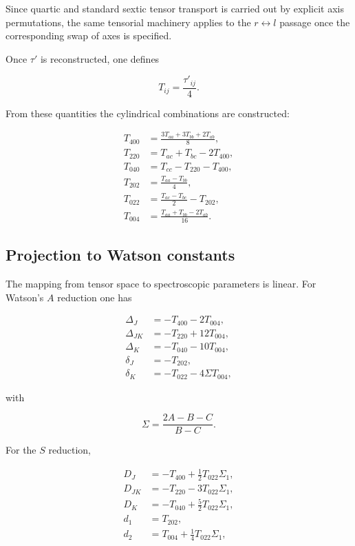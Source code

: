 \documentclass[aip,jcp,reprint,floatfix]{revtex4-2}
\begin{document}
Since quartic and standard sextic tensor transport is carried out by
explicit axis permutations, the same tensorial machinery applies to
the $r \leftrightarrow l$ passage once the corresponding swap of axes
is specified.

Once $\tau'$ is reconstructed, one defines

\begin{equation}
T_{ij} = \frac{\tau'_{ij}}{4}.
\end{equation}

From these quantities the cylindrical combinations are constructed:

\begin{align}
T_{400} &= \frac{3T_{aa}+3T_{bb}+2T_{ab}}{8}, \\
T_{220} &= T_{ac}+T_{bc}-2T_{400}, \\
T_{040} &= T_{cc}-T_{220}-T_{400}, \\
T_{202} &= \frac{T_{aa}-T_{bb}}{4}, \\
T_{022} &= \frac{T_{ac}-T_{bc}}{2}-T_{202}, \\
T_{004} &= \frac{T_{aa}+T_{bb}-2T_{ab}}{16}.
\end{align}

\subsection{Projection to Watson constants}

The mapping from tensor space to spectroscopic parameters is linear.
For Watson’s $A$ reduction one has

\begin{align}
\Delta_J   &= -T_{400}-2T_{004}, \\
\Delta_{JK}&= -T_{220}+12T_{004}, \\
\Delta_K   &= -T_{040}-10T_{004}, \\
\delta_J   &= -T_{202}, \\
\delta_K   &= -T_{022}-4\Sigma T_{004},
\end{align}

with

\begin{equation}
\Sigma = \frac{2A-B-C}{B-C}.
\end{equation}

For the $S$ reduction,

\begin{align}
D_J   &= -T_{400}+\frac12 T_{022}\Sigma_1, \\
D_{JK}&= -T_{220}-3T_{022}\Sigma_1, \\
D_K   &= -T_{040}+\frac52 T_{022}\Sigma_1, \\
d_1   &= T_{202}, \\
d_2   &= T_{004}+\frac14 T_{022}\Sigma_1,
\end{align}
\end{document}
